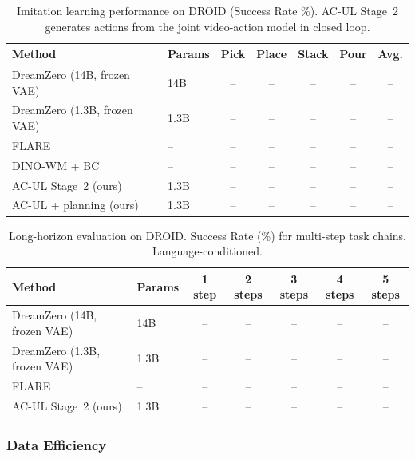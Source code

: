 \documentclass{article}
\begin{document}
\begin{table}[t]
\centering
\caption{Imitation learning performance on DROID (Success Rate \%). AC-UL Stage~2 generates actions from the joint video-action model in closed loop.}
\label{tab:imitation}
\begin{tabular}{llccccc}
\toprule
\textbf{Method} & \textbf{Params} & \textbf{Pick} & \textbf{Place} & \textbf{Stack} & \textbf{Pour} & \textbf{Avg.} \\
\midrule
DreamZero (14B, frozen VAE)      & 14B  & -- & -- & -- & -- & -- \\
DreamZero (1.3B, frozen VAE)     & 1.3B & -- & -- & -- & -- & -- \\
FLARE                            & --   & -- & -- & -- & -- & -- \\
DINO-WM + BC                     & --   & -- & -- & -- & -- & -- \\
\midrule
AC-UL Stage~2 (ours)             & 1.3B & -- & -- & -- & -- & -- \\
AC-UL + planning (ours)          & 1.3B & -- & -- & -- & -- & -- \\
\bottomrule
\end{tabular}
\end{table}

\begin{table}[t]
\centering
\caption{Long-horizon evaluation on DROID. Success Rate (\%) for multi-step task chains. Language-conditioned.}
\label{tab:long_horizon}
\begin{tabular}{llccccc}
\toprule
\textbf{Method} & \textbf{Params} & \textbf{1 step} & \textbf{2 steps} & \textbf{3 steps} & \textbf{4 steps} & \textbf{5 steps} \\
\midrule
DreamZero (14B, frozen VAE)   & 14B  & -- & -- & -- & -- & -- \\
DreamZero (1.3B, frozen VAE)  & 1.3B & -- & -- & -- & -- & -- \\
FLARE                         & --   & -- & -- & -- & -- & -- \\
\midrule
AC-UL Stage~2 (ours)          & 1.3B & -- & -- & -- & -- & -- \\
\bottomrule
\end{tabular}
\end{table}

\subsubsection{Data Efficiency}
\end{document}
